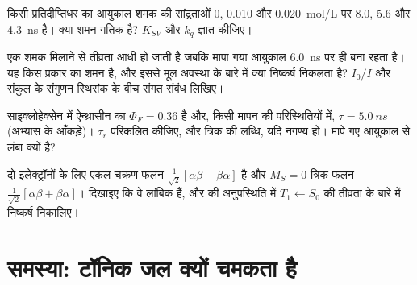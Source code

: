 \begin{exercise}[$\star\star$]\label{exo:b3:electronic-spectroscopy:9}
किसी प्रतिदीप्तिधर का आयुकाल शमक की सांद्रताओं 0, 0.010 और \qty{0.020}{mol/L} पर
8.0, 5.6 और \qty{4.3}{ns} है। क्या शमन गतिक है?
$K_{SV}$ और $k_q$ ज्ञात कीजिए।
\end{exercise}

\begin{exercise}[$\star\star\star$]\label{exo:b3:electronic-spectroscopy:10}
एक शमक मिलाने से  तीव्रता आधी हो जाती है जबकि मापा गया
आयुकाल \qty{6.0}{ns} पर ही बना रहता है। यह किस प्रकार का शमन है, और इससे मूल अवस्था के
बारे में क्या निष्कर्ष निकलता है? $I_0/I$
और संकुल के संगुणन स्थिरांक के बीच संगत संबंध लिखिए।
\end{exercise}

\begin{exercise}[$\star\star\star$]\label{exo:b3:electronic-spectroscopy:11}
साइक्लोहेक्सेन में ऐन्थ्रासीन का $\Phi_F = 0.36$ है और, किसी मापन की परिस्थितियों में,
$\tau = \qty{5.0}{ns}$ (अभ्यास के आँकड़े)। $\tau_r$ परिकलित कीजिए, और
त्रिक की लब्धि, यदि  नगण्य हो।  मापे गए आयुकाल से लंबा क्यों है?
\end{exercise}

\begin{exercise}[$\star\star\star$]\label{exo:b3:electronic-spectroscopy:12}
दो इलेक्ट्रॉनों के लिए एकल चक्रण फलन $\frac{1}{\sqrt2}[\alpha\beta - \beta\alpha]$ है
और $M_S = 0$ त्रिक फलन $\frac{1}{\sqrt2}[\alpha\beta + \beta\alpha]$। दिखाइए कि
वे लांबिक हैं, और  की अनुपस्थिति में $T_1 \leftarrow S_0$ की तीव्रता
के बारे में निष्कर्ष निकालिए।
\end{exercise}

\section{समस्या: टॉनिक जल क्यों चमकता है}

